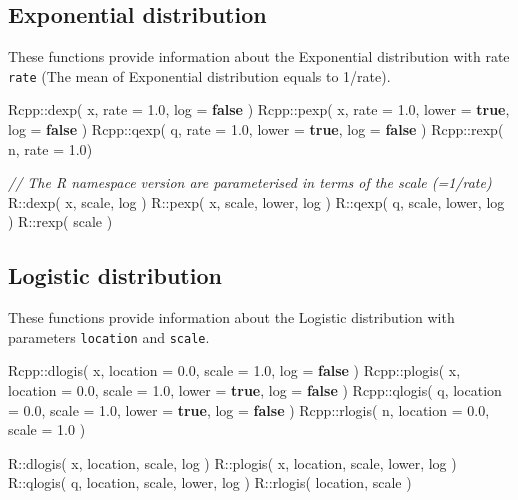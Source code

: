 \documentclass[]{book}
\newenvironment{Shaded}{\begin{snugshade}}{\end{snugshade}}
\newcommand{\CommentTok}[1]{\textcolor[rgb]{0.56,0.35,0.01}{\textit{#1}}}
\newcommand{\FloatTok}[1]{\textcolor[rgb]{0.00,0.00,0.81}{#1}}
\newcommand{\KeywordTok}[1]{\textcolor[rgb]{0.13,0.29,0.53}{\textbf{#1}}}
\newcommand{\NormalTok}[1]{#1}
\begin{document}
\hypertarget{exponential-distribution}{%
\subsection{Exponential distribution}\label{exponential-distribution}}

These functions provide information about the Exponential distribution with rate \texttt{rate} (The mean of Exponential distribution equals to 1/rate).

\begin{Shaded}
\begin{Highlighting}[]
\NormalTok{Rcpp::dexp( x, rate = }\FloatTok{1.0}\NormalTok{,               log = }\KeywordTok{false}\NormalTok{ )}
\NormalTok{Rcpp::pexp( x, rate = }\FloatTok{1.0}\NormalTok{, lower = }\KeywordTok{true}\NormalTok{, log = }\KeywordTok{false}\NormalTok{ )}
\NormalTok{Rcpp::qexp( q, rate = }\FloatTok{1.0}\NormalTok{, lower = }\KeywordTok{true}\NormalTok{, log = }\KeywordTok{false}\NormalTok{ )}
\NormalTok{Rcpp::rexp( n, rate = }\FloatTok{1.0}\NormalTok{)}

\CommentTok{// The R namespace version are parameterised in terms of the scale (=1/rate)}
\NormalTok{R::dexp( x, scale,        log )}
\NormalTok{R::pexp( x, scale, lower, log )}
\NormalTok{R::qexp( q, scale, lower, log )}
\NormalTok{R::rexp(    scale )}
\end{Highlighting}
\end{Shaded}

\hypertarget{logistic-distribution}{%
\subsection{Logistic distribution}\label{logistic-distribution}}

These functions provide information about the Logistic distribution with parameters \texttt{location} and \texttt{scale}.

\begin{Shaded}
\begin{Highlighting}[]
\NormalTok{Rcpp::dlogis( x, location = }\FloatTok{0.0}\NormalTok{, scale = }\FloatTok{1.0}\NormalTok{,               log = }\KeywordTok{false}\NormalTok{ )}
\NormalTok{Rcpp::plogis( x, location = }\FloatTok{0.0}\NormalTok{, scale = }\FloatTok{1.0}\NormalTok{, lower = }\KeywordTok{true}\NormalTok{, log = }\KeywordTok{false}\NormalTok{ )}
\NormalTok{Rcpp::qlogis( q, location = }\FloatTok{0.0}\NormalTok{, scale = }\FloatTok{1.0}\NormalTok{, lower = }\KeywordTok{true}\NormalTok{, log = }\KeywordTok{false}\NormalTok{ )}
\NormalTok{Rcpp::rlogis( n, location = }\FloatTok{0.0}\NormalTok{, scale = }\FloatTok{1.0}\NormalTok{ )}

\NormalTok{R::dlogis( x, location, scale,        log )}
\NormalTok{R::plogis( x, location, scale, lower, log )}
\NormalTok{R::qlogis( q, location, scale, lower, log )}
\NormalTok{R::rlogis(    location, scale )}
\end{Highlighting}
\end{Shaded}
\end{document}

